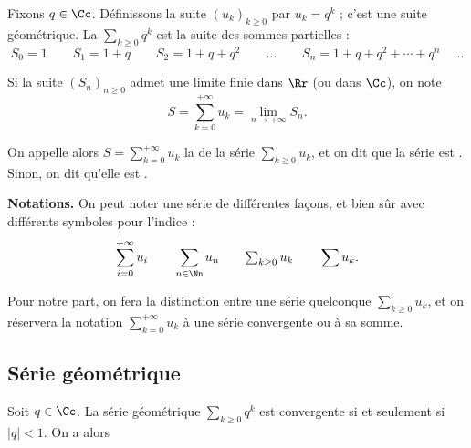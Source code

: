 \documentclass[class=report,crop=false]{standalone}
\begin{document}
\begin{exemple}
Fixons $q\in \Cc$. Définissons la suite $(u_k)_{k \ge 0}$ par
$u_k = q^k$ ; c'est une suite géométrique.
La  $\displaystyle \sum_{k \ge 0} q^k$ est la suite des sommes partielles :
$$S_0 = 1 \qquad S_1 = 1 + q \qquad S_2 = 1+q+q^2 \qquad \ldots \qquad S_n = 1+q+q^2+\cdots+q^n \quad \ldots$$
\end{exemple}


\begin{definition}
Si la suite $(S_n)_{n \ge 0}$ admet une limite finie dans $\Rr$ (ou dans $\Cc$),
on note
$$S = \sum_{k=0}^{+\infty} u_k =\lim_{n\to+\infty} S_n.$$

On appelle alors $S= \sum_{k=0}^{+\infty} u_k$ la  de la série $\sum_{k \ge 0} u_k$,
et on dit que la série est .
Sinon, on dit qu'elle est . 
\end{definition}



\textbf{Notations.}
On peut noter une série de différentes façons, et bien sûr avec différents symboles pour l'indice : 
$$\sum_{i = 0}^{+\infty} u_i \qquad \sum_{n \in \Nn} u_n \qquad {\textstyle \sum_{k \ge 0} u_k}\qquad \sum u_k.$$

Pour notre part, on fera la distinction entre une série quelconque $\displaystyle \sum_{k \ge 0} u_k$,
et on réservera la notation $\displaystyle \sum_{k=0}^{+\infty} u_k$ à une série convergente ou à sa somme.




\subsection{Série géométrique}


\begin{proposition}
Soit $q\in \Cc$. La série géométrique $\sum_{k \ge 0} q^k$ est convergente 
si et seulement si $|q|<1$. On a alors 
\end{proposition}
\end{document}
